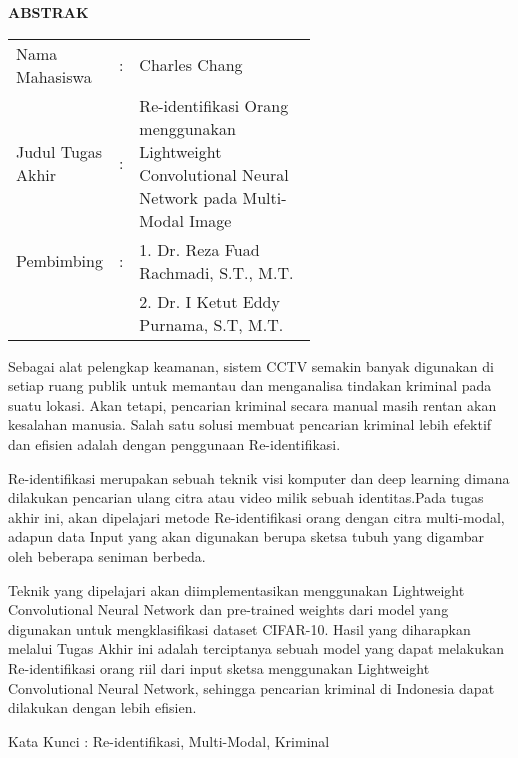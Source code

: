 \begin{center}
\Large\textbf{ABSTRAK}
\end{center}
\vspace{1ex}

\begin{adjustwidth}{-0.2cm}{}
\begin{tabular}{lcp{0.6\linewidth}}
Nama Mahasiswa &:& Charles Chang \\
Judul Tugas Akhir &:& Re-identifikasi Orang menggunakan
Lightweight Convolutional Neural Network
pada Multi-Modal Image\\
Pembimbing &:& 1. Dr. Reza Fuad Rachmadi, S.T., M.T. \\
& & 2. Dr. I Ketut Eddy Purnama, S.T, M.T.  \\
\end{tabular}
\end{adjustwidth}
\vspace{1ex}

\setlength{\parindent}{0cm} Sebagai alat pelengkap keamanan, sistem CCTV semakin banyak digunakan di setiap ruang publik untuk memantau dan menganalisa tindakan kriminal pada suatu lokasi. Akan tetapi, pencarian kriminal secara manual masih rentan akan kesalahan manusia. Salah satu solusi membuat pencarian kriminal lebih efektif dan efisien adalah dengan penggunaan Re-identifikasi.
\par  Re-identifikasi merupakan sebuah teknik visi komputer dan deep learning dimana dilakukan pencarian ulang citra atau video milik sebuah identitas.Pada tugas akhir ini, akan dipelajari metode Re-identifikasi orang dengan citra multi-modal, adapun data Input yang akan digunakan berupa sketsa tubuh yang digambar oleh beberapa seniman berbeda.
\par  Teknik yang dipelajari akan diimplementasikan menggunakan Lightweight Convolutional Neural Network dan pre-trained weights dari model yang digunakan untuk mengklasifikasi dataset CIFAR-10. Hasil yang diharapkan melalui Tugas Akhir ini adalah terciptanya sebuah model yang dapat melakukan Re-identifikasi orang riil dari input sketsa menggunakan Lightweight Convolutional Neural Network, sehingga pencarian kriminal di Indonesia dapat dilakukan dengan lebih efisien.

\vspace{2ex}

Kata Kunci : Re-identifikasi, Multi-Modal, Kriminal
\newpage